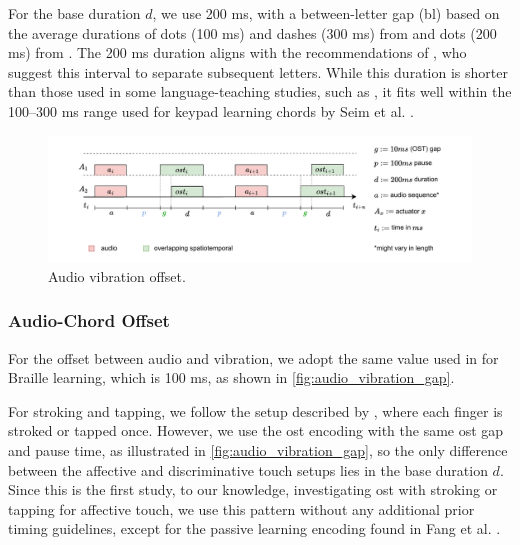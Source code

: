 For the base duration $d$, we use 200 ms, with a between-letter gap (bl) based on the average durations of dots (100 ms) and dashes (300 ms) from \cite{Seim2018} and dots (200 ms) from \cite{Pescara2019}. The 200 ms duration aligns with the recommendations of \cite{Luzhnica2018}, who suggest this interval to separate subsequent letters. While this duration is shorter than those used in some language-teaching studies, such as \cite{Seim2014a}, it fits well within the 100–300 ms range used for keypad learning chords by Seim et al. \cite{Seim2017}.

\begin{figure}
    \centering
    \includegraphics[width=\linewidth]{src/pictures/audio_vibration_diagram.drawio.pdf}
    \caption{Audio vibration offset.}
    \label{fig:audio_vibration_gap}
\end{figure}

\subsubsection{Audio-Chord Offset}
For the offset between audio and vibration, we adopt the same value used in \cite{Seim2017} for Braille learning, which is 100 ms, as shown in \autoref{fig:audio_vibration_gap}.

For stroking and tapping, we follow the setup described by \cite{Fang2023}, where each finger is stroked or tapped once. However, we use the \gls{ost} encoding with the same \gls{ost} gap and pause time, as illustrated in \autoref{fig:audio_vibration_gap}, so the only difference between the affective and discriminative touch setups lies in the base duration $d$. Since this is the first study, to our knowledge, investigating \gls{ost} with stroking or tapping for affective touch, we use this pattern without any additional prior timing guidelines, except for the passive learning encoding found in Fang et al. \cite{Fang2023}.


